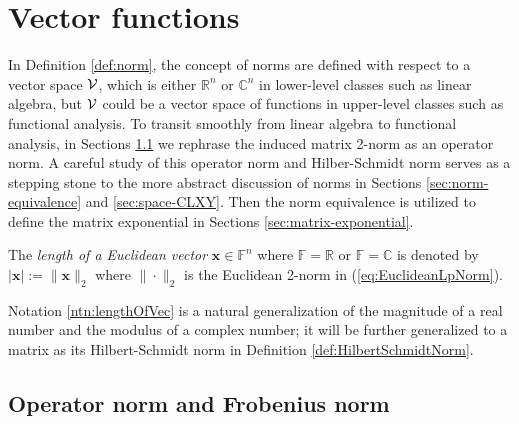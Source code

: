 \section{Vector functions}
\label{sec:sever-vari-diff}

\begin{rem} 
  In Definition \ref{def:norm},
  the concept of norms are defined with respect
  to a vector space ${\cal V}$,
  which is either $\mathbb{R}^n$ or $\mathbb{C}^n$
  in lower-level classes such as linear algebra,
  but ${\cal V}$ could be a vector space of functions
  in upper-level classes such as
  functional analysis.
  To transit smoothly from linear algebra
  to functional analysis,
  in Sections \ref{sec:operator-norm}
  we rephrase the induced matrix 2-norm
  as an operator norm.
  A careful study of this operator norm
  and Hilber-Schmidt norm
  serves as a stepping stone
  to the more abstract discussion of norms
  in Sections \ref{sec:norm-equivalence}
  and \ref{sec:space-CLXY}.
  Then the norm equivalence is utilized
  to define the matrix exponential
  in Sections \ref{sec:matrix-exponential}.
\end{rem}

\begin{ntn}
  \label{ntn:lengthOfVec}
  The \emph{length of a Euclidean vector}
  $\mathbf{x}\in \mathbb{F}^n$
  where $\mathbb{F}=\mathbb{R}$ or $\mathbb{F}=\mathbb{C}$
  is denoted by $|\mathbf{x}|:=\|\mathbf{x}\|_2$
  where $\|\cdot\|_2$ is
  the Euclidean 2-norm in (\ref{eq:EuclideanLpNorm}).
\end{ntn}

\begin{rem}
  Notation \ref{ntn:lengthOfVec} is a natural generalization
  of the magnitude of a real number and the modulus of a complex number;
  it will be further generalized to a matrix as its Hilbert-Schmidt norm
  in Definition \ref{def:HilbertSchmidtNorm}.
\end{rem}


\subsection{Operator norm and Frobenius norm}
\label{sec:operator-norm}

